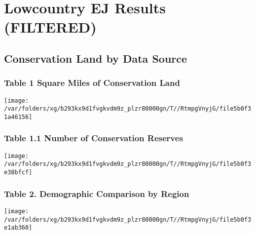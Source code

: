 \documentclass[landscape]{article}
\author{}
\date{\vspace{-2.5em}}
\begin{document}
\hypertarget{lowcountry-ej-results-filtered}{%
\section{Lowcountry EJ Results
(FILTERED)}\label{lowcountry-ej-results-filtered}}

\hypertarget{conservation-land-by-data-source}{%
\subsection{Conservation Land by Data
Source}\label{conservation-land-by-data-source}}

\hypertarget{table-1-square-miles-of-conservation-land}{%
\subsubsection{Table 1 Square Miles of Conservation
Land}\label{table-1-square-miles-of-conservation-land}}

\texttt{[image: /var/folders/xg/b293kx9d1fvgkvdm9z\_plzr80000gn/T//RtmpgVnyjG/file5b0f31a46156]}

\hypertarget{table-1.1-number-of-conservation-reserves}{%
\subsubsection{Table 1.1 Number of Conservation
Reserves}\label{table-1.1-number-of-conservation-reserves}}

\texttt{[image: /var/folders/xg/b293kx9d1fvgkvdm9z\_plzr80000gn/T//RtmpgVnyjG/file5b0f3e38bfcf]}

\hypertarget{table-2.-demographic-comparison-by-region}{%
\subsubsection{Table 2. Demographic Comparison by
Region}\label{table-2.-demographic-comparison-by-region}}

\texttt{[image: /var/folders/xg/b293kx9d1fvgkvdm9z\_plzr80000gn/T//RtmpgVnyjG/file5b0f3e1ab360]}
\end{document}
